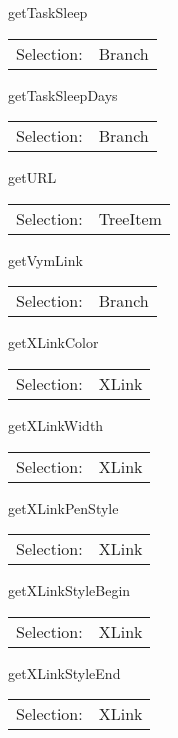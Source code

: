 \item getTaskSleep\\
\begin{tabular}{rl}
  Selection: & Branch\\
\end{tabular}

\item getTaskSleepDays\\
\begin{tabular}{rl}
  Selection: & Branch\\
\end{tabular}

\item getURL\\
\begin{tabular}{rl}
  Selection: & TreeItem\\
\end{tabular}

\item getVymLink\\
\begin{tabular}{rl}
  Selection: & Branch\\
\end{tabular}

\item getXLinkColor\\
\begin{tabular}{rl}
  Selection: & XLink\\
\end{tabular}

\item getXLinkWidth\\
\begin{tabular}{rl}
  Selection: & XLink\\
\end{tabular}

\item getXLinkPenStyle\\
\begin{tabular}{rl}
  Selection: & XLink\\
\end{tabular}

\item getXLinkStyleBegin\\
\begin{tabular}{rl}
  Selection: & XLink\\
\end{tabular}

\item getXLinkStyleEnd\\
\begin{tabular}{rl}
  Selection: & XLink\\
\end{tabular}

